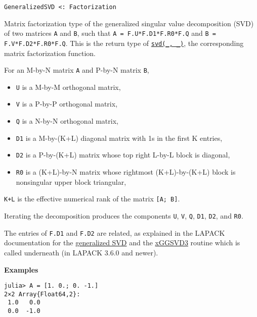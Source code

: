 \begin{adjustwidth}{2em}{0pt}


\begin{verbatim}
GeneralizedSVD <: Factorization
\end{verbatim}

Matrix factorization type of the generalized singular value decomposition (SVD) of two matrices \texttt{A} and \texttt{B}, such that \texttt{A = F.U*F.D1*F.R0*F.Q{\textquotesingle}} and \texttt{B = F.V*F.D2*F.R0*F.Q{\textquotesingle}}. This is the return type of \hyperlink{6661056220970412040}{\texttt{svd(\_, \_)}}, the corresponding matrix factorization function.

For an M-by-N matrix \texttt{A} and P-by-N matrix \texttt{B},

\begin{itemize}
\item \texttt{U} is a M-by-M orthogonal matrix,


\item \texttt{V} is a P-by-P orthogonal matrix,


\item \texttt{Q} is a N-by-N orthogonal matrix,


\item \texttt{D1} is a M-by-(K+L) diagonal matrix with 1s in the first K entries,


\item \texttt{D2} is a P-by-(K+L) matrix whose top right L-by-L block is diagonal,


\item \texttt{R0} is a (K+L)-by-N matrix whose rightmost (K+L)-by-(K+L) block is          nonsingular upper block triangular,

\end{itemize}
\texttt{K+L} is the effective numerical rank of the matrix \texttt{[A; B]}.

Iterating the decomposition produces the components \texttt{U}, \texttt{V}, \texttt{Q}, \texttt{D1}, \texttt{D2}, and \texttt{R0}.

The entries of \texttt{F.D1} and \texttt{F.D2} are related, as explained in the LAPACK documentation for the \href{http://www.netlib.org/lapack/lug/node36.html}{generalized SVD} and the \href{http://www.netlib.org/lapack/explore-html/d6/db3/dggsvd3\_8f.html}{xGGSVD3} routine which is called underneath (in LAPACK 3.6.0 and newer).

\textbf{Examples}


\begin{verbatim}
julia> A = [1. 0.; 0. -1.]
2×2 Array{Float64,2}:
 1.0   0.0
 0.0  -1.0


\end{verbatim}
\end{adjustwidth}

